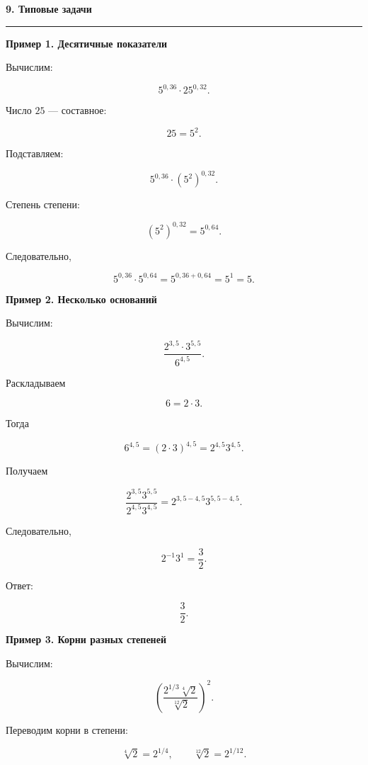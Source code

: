 \documentclass[a4paper,12pt]{article}
\newcommand{\MainSection}[1]{%
  \vspace{0.7em}
  {\Large\bfseries\color{darkaccent}#1\par}
  \vspace{0.25em}
  {\color{accent}\rule{\linewidth}{0.6pt}}
  \vspace{0.5em}
}
\newcommand{\SubSection}[1]{%
  \vspace{0.5em}
  {\large\bfseries\color{accent}#1\par}
  \vspace{0.2em}
}
\begin{document}
\clearpage


\MainSection{9. Типовые задачи}

\SubSection{Пример 1. Десятичные показатели}

Вычислим:

\[
5^{0{,}36}\cdot25^{0{,}32}.
\]

Число \(25\) --- составное:

\[
25=5^2.
\]

Подставляем:

\[
5^{0{,}36}\cdot(5^2)^{0{,}32}.
\]

Степень степени:

\[
(5^2)^{0{,}32}=5^{0{,}64}.
\]

Следовательно,

\[
5^{0{,}36}\cdot5^{0{,}64}
=
5^{0{,}36+0{,}64}
=
5^1
=
\boxed5.
\]


\SubSection{Пример 2. Несколько оснований}

Вычислим:

\[
\frac{
2^{3{,}5}\cdot3^{5{,}5}
}{
6^{4{,}5}
}.
\]

Раскладываем

\[
6=2\cdot3.
\]

Тогда

\[
6^{4{,}5}
=
(2\cdot3)^{4{,}5}
=
2^{4{,}5}3^{4{,}5}.
\]

Получаем

\[
\frac{
2^{3{,}5}3^{5{,}5}
}{
2^{4{,}5}3^{4{,}5}
}
=
2^{3{,}5-4{,}5}
3^{5{,}5-4{,}5}.
\]

Следовательно,

\[
2^{-1}3^1
=
\frac32.
\]

Ответ:

\[
\boxed{\frac32}.
\]


\SubSection{Пример 3. Корни разных степеней}

Вычислим:

\[
\left(
\frac{
2^{1/3}\sqrt[4]{2}
}{
\sqrt[12]{2}
}
\right)^2.
\]

Переводим корни в степени:

\[
\sqrt[4]{2}=2^{1/4},
\qquad
\sqrt[12]{2}=2^{1/12}.
\]
\end{document}

